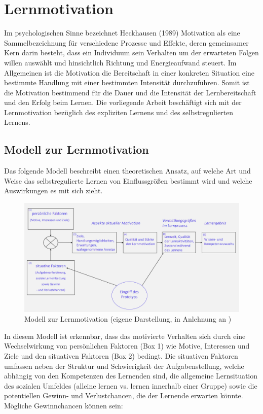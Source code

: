     \section{Lernmotivation} \label{Lernmotivation}
    Im psychologischen Sinne bezeichnet Heckhausen (1989) Motivation \glqq als eine Sammelbezeichnung für verschiedene Prozesse und Effekte, deren gemeinsamer Kern darin besteht, dass ein Individuum
    sein Verhalten um der erwarteten Folgen willen auswählt und hinsichtlich Richtung und Energieaufwand steuert\grqq{}. \parencite[10]{heckhausen.1989} 
    Im Allgemeinen ist die Motivation die Bereitschaft in einer konkreten Situation eine bestimmte Handlung mit einer bestimmten Intensität durchzuführen. \parencite[4]{tischner.2007} 
    Somit ist die Motivation bestimmend für die Dauer und die Intensität der Lernbereitschaft und den Erfolg beim Lernen. \parencite[44]{Grotian.1999}
    Die vorliegende Arbeit beschäftigt sich mit der Lernmotivation bezüglich des expliziten Lernens und des selbstregulierten Lernens.
    
    \subsection{Modell zur Lernmotivation}
    Das folgende Modell beschreibt einen theoretischen Ansatz, auf welche Art und Weise das selbstregulierte Lernen von Einflussgrößen bestimmt wird und welche Auswirkungen es mit sich zieht.
    
    \begin{figure}[H]   
        \centering
        \includegraphics[width=0.6\linewidth]{images/Rahmenmodell_Lernmotivation.png}
        \caption[Modell zur Lernmotivation]{Modell zur Lernmotivation (eigene Darstellung, in Anlehnung an \parencite{rheinberg.2000})}
        \label{fig:Rahmenmodell zu Bedingungen und Auswirkungen von Lernmotivation}
    \end{figure}
    
    In diesem Modell ist erkennbar, dass das motivierte Verhalten sich durch eine Wechselwirkung von persönlichen Faktoren (Box 1) wie Motive, Interessen und Ziele und den situativen Faktoren (Box 2) bedingt.
    Die situativen Faktoren umfassen neben der Struktur und Schwierigkeit der Aufgabenstellung, welche abhängig von den 
    Kompetenzen des Lernenden sind,
    die allgemeine Lernsituation des sozialen Umfeldes (alleine lernen vs. lernen innerhalb einer Gruppe)
    sowie die potentiellen Gewinn- und Verlustchancen, die der Lernende erwarten könnte. Mögliche Gewinnchancen können sein:
    
